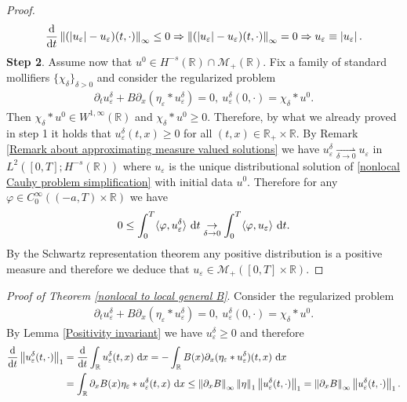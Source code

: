 \documentclass[11pt,reqno]{amsart}
\numberwithin{equation}{section}
\def\dd{{\rm d}}
\begin{document}
\begin{proof}
\begin{align*}
\frac{\dd}{\dd t}\left\Vert (\left\vert u_{\varepsilon}\right\vert -u_{\varepsilon})(t,\cdot)\right\Vert_{\infty}\leq 0\Rightarrow \left\Vert (\left\vert u_{\varepsilon}\right\vert -u_{\varepsilon})(t,\cdot)\right\Vert_{\infty}=0\Rightarrow u_{\varepsilon}\equiv \left\vert u_{\varepsilon}\right\vert.        
\end{align*}  
\textbf{Step 2}. Assume now that  $u^{0}\in H^{-s}(\mathbb{R})\cap \mathcal{M}_{+}(\mathbb{R})$. Fix a family of standard mollifiers $\{\chi_{\delta}\}_{\delta>0}$ and consider the regularized problem 
\begin{align*}
\partial_{t}u_{\varepsilon}^{\delta}+B\partial_{x}(\eta_{\varepsilon}\ast u_{\varepsilon}^{\delta})=0, \ u_{\varepsilon}^{\delta}(0,\cdot)=\chi_{\delta}\ast u^{0}.     
\end{align*}
Then $\chi_{\delta}\ast u^{0}\in W^{1,\infty}(\mathbb{R})$ and $\chi_{\delta}\ast u^{0}\geq 0$. Therefore, by what we already proved in step 1 it holds that $u_{\varepsilon}^{\delta}(t,x)\geq 0$ for all $(t,x)\in \mathbb{R}_{+}\times \mathbb{R}$. By Remark \ref{Remark about approximating measure valued solutions} we have $u_{\varepsilon}^{\delta}\underset{\delta \rightarrow 0}{\rightharpoonup} u_{\varepsilon}$ in $L^{2}([0,T];H^{-s}(\mathbb{R}))$ where $u_{\varepsilon}$ is the unique distributional solution of \eqref{nonlocal Cauhy problem simplification} with initial data $u^{0}$. Therefore for any $\varphi\in C^{\infty}_{0}((-a,T)\times \mathbb{R})$ we have 
\begin{align*}
0\leq \int_{0}^{T}\langle \varphi,u_{\varepsilon}^{\delta}\rangle\ \dd t \underset{\delta \rightarrow 0}{\rightarrow}\int_{0}^{T}\langle \varphi,u_{\varepsilon}\rangle\ \dd t.    
\end{align*}
By the Schwartz representation theorem any positive distribution is a positive measure and therefore we deduce that   $u_{\varepsilon}\in \mathcal{M}_{+}([0,T]\times \mathbb{R})$. 
\end{proof}
\textit{Proof of Theorem \ref{nonlocal to local general B}}.  Consider the regularized problem 
\begin{align*}
\partial_{t}u_{\varepsilon}^{\delta}+B\partial_{x}(\eta_{\varepsilon}\ast u_{\varepsilon}^{\delta})=0, \ u_{\varepsilon}^{\delta}(0,\cdot)=\chi_{\delta}\ast u^{0}.     
\end{align*}
By Lemma \ref{Positivity invariant} we have 
$u_{\varepsilon}^{\delta}\geq 0$ and therefore 
\begin{align*}
\frac{\dd}{\dd t}\left\Vert u_{\varepsilon}^{\delta}(t,\cdot)\right\Vert_{1}&=\frac{\dd}{\dd t}\int_{\mathbb{R}}u_{\varepsilon}^{\delta}(t,x)\ \dd x=-\int_{\mathbb{R}}B(x)\partial_{x}(\eta_{\varepsilon}\ast u_{\varepsilon}^{\delta})(t,x)\ \dd x\\
&=\int_{\mathbb{R}}\partial_{x}B(x)\eta_{\varepsilon}\ast u_{\varepsilon}^{\delta}(t,x)\ \dd x\leq \left\Vert \partial_{x}B\right\Vert_{\infty}\left\Vert \eta\right\Vert_{1}\left\Vert u_{\varepsilon}^{\delta}(t,\cdot)\right\Vert_{1}=\left\Vert \partial_{x}B\right\Vert_{\infty}\left\Vert u_{\varepsilon}^{\delta}(t,\cdot)\right\Vert_{1}.    
\end{align*}
\end{document}
